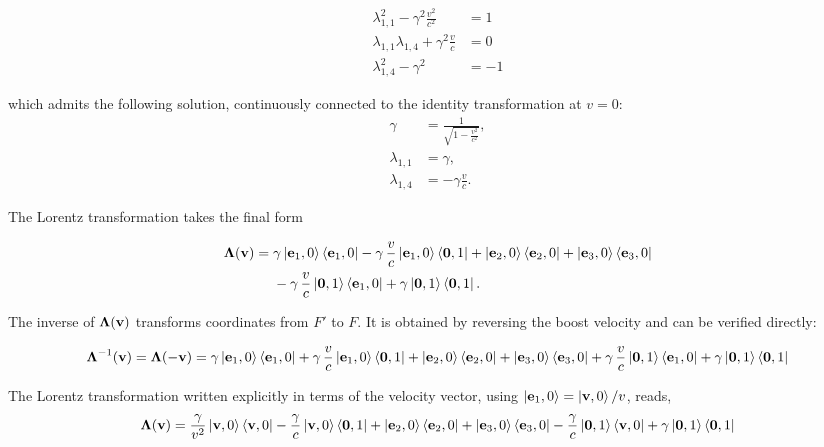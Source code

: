 \documentclass[12pt]{article}
\begin{document}
\begin{align}
  \lambda_{1,1}^2 - \gamma^2\displaystyle\frac{v^2}{c^2} &= 1 \\
  \lambda_{1,1}\lambda_{1,4} + \gamma^2\displaystyle\frac{v}{c} &= 0 \\
  \lambda_{1,4}^2 - \gamma^2 &= -1
\end{align}

which admits the following solution, continuously connected to the
identity transformation at $v=0$:
\begin{align}
  \gamma
  &=
  \frac{1}{\sqrt{1-\frac{v^2}{c^2}}},
  \\
  \lambda_{1,1}
  &=
  \gamma,
  \\
  \lambda_{1,4}
  &=
  -\gamma\frac{v}{c}.
\end{align}

The Lorentz transformation takes the final form

\begin{equation}
  \begin{aligned}
    \boldsymbol{\Lambda}(\vb{v}) =\;
      &\gamma\ket{\vb{e}_1,0}\bra{\vb{e}_1,0}
      - \gamma\,\frac{v}{c}
        \ket{\vb{e}_1,0}\bra{\vb{0},1}
      + \ket{\vb{e}_2,0}\bra{\vb{e}_2,0}
      + \ket{\vb{e}_3,0}\bra{\vb{e}_3,0}
      \\
      &- \gamma\,\frac{v}{c}
        \ket{\vb{0},1}\bra{\vb{e}_1,0}
      + \gamma\ket{\vb{0},1}\bra{\vb{0},1}.
  \end{aligned}
  \label{eq:Lorentz_transformation}
\end{equation}

The inverse of $\boldsymbol{\Lambda}(\vb{v})$ transforms coordinates from
$F'$ to $F$. It is obtained by reversing the boost velocity and can be
verified directly:

\begin{equation}
  \boldsymbol{\Lambda}^{-1}(\vb{v}) = \boldsymbol{\Lambda}(-\vb{v}) =
    \gamma\ket{\vb{e}_1,0}\bra{\vb{e}_1,0}
    + \gamma\,\frac{v}{c}\ket{\vb{e}_1,0}\bra{\vb{0},1}
    + \ket{\vb{e}_2,0}\bra{\vb{e}_2,0}
    + \ket{\vb{e}_3,0}\bra{\vb{e}_3,0}
    + \gamma\,\frac{v}{c}\ket{\vb{0},1}\bra{\vb{e}_1,0}
    + \gamma\ket{\vb{0},1}\bra{\vb{0},1}
  \label{eq:Lorentz_inverse}
\end{equation}

The Lorentz transformation written explicitly in terms of the velocity vector, using
$\ket{\vb{e}_1,0} = \ket{\vb{v},0}/v$, reads,
\begin{equation}
  \boldsymbol{\Lambda}(\vb{v}) =
    \frac{\gamma}{v^2}\ket{\vb{v},0}\bra{\vb{v},0}
    - \frac{\gamma}{c}\ket{\vb{v},0}\bra{\vb{0},1}
    + \ket{\vb{e}_2,0}\bra{\vb{e}_2,0}
    + \ket{\vb{e}_3,0}\bra{\vb{e}_3,0}
    - \frac{\gamma}{c}\ket{\vb{0},1}\bra{\vb{v},0}
    + \gamma\ket{\vb{0},1}\bra{\vb{0},1}
  \label{eq:Lorentz_in_velocity}
\end{equation}
\end{document}
